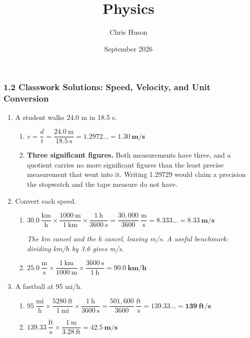\documentclass[12pt, twoside]{article}
\title{Physics}
\author{Chris Huson}
\date{September 2026}
\begin{document}
\subsubsection*{1.2 Classwork Solutions: Speed, Velocity, and Unit Conversion}

\begin{enumerate}[itemsep=0.35cm]

\item A student walks 24.0 m in 18.5 s.
  \begin{enumerate}[itemsep=0.25cm]
    \item $v = \dfrac{d}{t} = \dfrac{24.0~\text{m}}{18.5~\text{s}} = 1.2972\ldots = \mathbf{1.30~\textbf{m/s}}$
    \item \textbf{Three significant figures.} Both measurements have three, and a quotient
      carries no more significant figures than the least precise measurement that went into it.
      Writing 1.29729 would claim a precision the stopwatch and the tape measure do not have.
  \end{enumerate}

\item Convert each speed.
  \begin{enumerate}[itemsep=0.35cm]
    \item $30.0~\dfrac{\text{km}}{\text{h}} \times \dfrac{1000~\text{m}}{1~\text{km}}
      \times \dfrac{1~\text{h}}{3600~\text{s}}
      = \dfrac{30{,}000}{3600}~\dfrac{\text{m}}{\text{s}} = 8.333\ldots
      = \mathbf{8.33~\textbf{m/s}}$

      \emph{The km cancel and the h cancel, leaving m/s. A useful benchmark: dividing
      km/h by 3.6 gives m/s.}
    \item $25.0~\dfrac{\text{m}}{\text{s}} \times \dfrac{1~\text{km}}{1000~\text{m}}
      \times \dfrac{3600~\text{s}}{1~\text{h}} = \mathbf{90.0~\textbf{km/h}}$
  \end{enumerate}

\item A fastball at 95 mi/h.
  \begin{enumerate}[itemsep=0.35cm]
    \item $95~\dfrac{\text{mi}}{\text{h}} \times \dfrac{5280~\text{ft}}{1~\text{mi}}
      \times \dfrac{1~\text{h}}{3600~\text{s}}
      = \dfrac{501{,}600}{3600}~\dfrac{\text{ft}}{\text{s}} = 139.33\ldots
      = \mathbf{139~\textbf{ft/s}}$
    \item $139.33~\dfrac{\text{ft}}{\text{s}} \times \dfrac{1~\text{m}}{3.28~\text{ft}}
      = \mathbf{42.5~\textbf{m/s}}$


\end{enumerate}
\end{enumerate}
\end{document}
